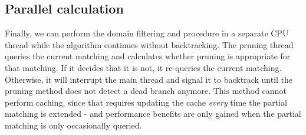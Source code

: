 \subsection{Parallel calculation}
Finally, we can perform the domain filtering and procedure in a separate CPU thread while the algorithm continues without backtracking. The pruning thread queries the current matching and calculates whether pruning is appropriate for that matching. If it decides that it is not, it re-queries the current matching. Otherwise, it will interrupt the main thread and signal it to backtrack until the pruning method does not detect a dead branch anymore. This method cannot perform caching, since that requires updating the cache \textit{every} time the partial matching is extended - and performance benefits are only gained when the partial matching is only occasionally queried.
